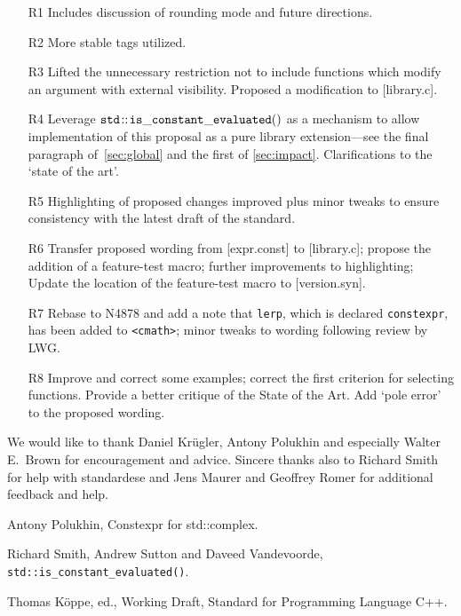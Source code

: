 \documentclass[prd,twocolumn,amsmath,amssymb,nofootinbib,eqsecnum]{revtex4-1}
\newcommand{\constexpr}{\code{constexpr}\xspace}
\newcommand{\code}[1]{{\tt #1}}
\newcommand{\header}[1]{{\tt <#1>}}
\newcommand{\cmath}{\header{cmath}}
\begin{document}
\begin{enumerate}
	\item[R1] Includes discussion of rounding mode and future directions. 
	
	\item[R2] More stable tags utilized.
	
	\item[R3] Lifted the unnecessary restriction not to include functions which modify an argument with external visibility. Proposed a modification to [library.c].
	
	\item [R4] Leverage $\code{std\!::\!is\_constant\_evaluated()}$ as a mechanism to allow implementation of this proposal as a pure library extension---see the final paragraph of~\ref{sec:global} and the first of \ref{sec:impact}. Clarifications to the `state of the art'.
	
	\item [R5] Highlighting of proposed changes improved plus minor tweaks to ensure consistency with the latest draft of the standard.
	
	\item [R6] Transfer proposed wording from [expr.const] to [library.c]; propose the addition of a feature-test macro; further improvements to highlighting; Update the location of the feature-test macro to [version.syn].
	
	\item [R7] Rebase to N4878 and add a note that \code{lerp}, which is declared \constexpr, has been added to \cmath; minor tweaks to wording following review by LWG.
	
	\item [R8] Improve and correct some examples; correct the first criterion for selecting functions. Provide a better critique of the State of the Art. Add `pole error' to the proposed wording.
\end{enumerate}

\begin{acknowledgments}
	We would like to thank Daniel Kr\"ugler, Antony Polukhin and especially Walter E.~Brown 
	for encouragement and advice. Sincere thanks also to Richard Smith for help with standardese
	and Jens Maurer and Geoffrey Romer for additional feedback and help.
\end{acknowledgments}


\begin{thebibliography}{1}
	 Antony Polukhin, Constexpr for std::complex.	
	
	 Richard Smith, Andrew Sutton and Daveed Vandevoorde, \code{std\!::\!is\_constant\_evaluated()}.
	
	 Thomas K\"oppe, ed., Working Draft, Standard for Programming Language C++.	
\end{thebibliography}
\end{document}
